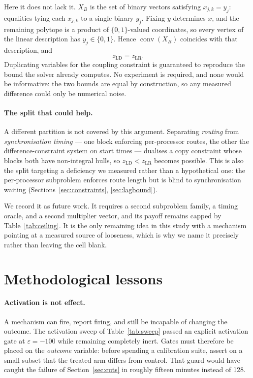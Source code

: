 \documentclass[11pt,a4paper]{article}
\begin{document}
Here it does not lack it. $X_B$ is the set of binary vectors satisfying
$x_{j,k}=y_j$: equalities tying each $x_{j,k}$ to a single binary $y_j$. Fixing
$y$ determines $x$, and the remaining polytope is a product of $\{0,1\}$-valued
coordinates, so every vertex of the linear description has $y_j\in\{0,1\}$. Hence
$\operatorname{conv}(X_B)$ coincides with that description, and
\[
z_{\mathrm{LD}}=z_{\mathrm{LR}} .
\]
Duplicating variables for the coupling constraint is guaranteed to reproduce the
bound the solver already computes. No experiment is required, and none would be
informative: the two bounds are equal by construction, so any measured difference
could only be numerical noise.

\paragraph{The split that could help.}
A different partition is not covered by this argument. Separating \emph{routing}
from \emph{synchronisation timing} --- one block enforcing per-processor routes, the
other the difference-constraint system on start times --- dualises a copy constraint
whose blocks both have non-integral hulls, so $z_{\mathrm{LD}}<z_{\mathrm{LR}}$
becomes possible. This is also the split targeting a deficiency we measured rather
than a hypothetical one: the per-processor subproblem enforces route length but is
blind to synchronisation waiting (Sections~\ref{sec:constraints},
\ref{sec:lagbound}).

We record it as future work. It requires a second subproblem family, a timing
oracle, and a second multiplier vector, and its payoff remains capped by
Table~\ref{tab:ceiling}. It is the only remaining idea in this study with a
mechanism pointing at a measured source of looseness, which is why we name it
precisely rather than leaving the cell blank.

\section{Methodological lessons}\label{sec:lessons}

\paragraph{Activation is not effect.}
A mechanism can fire, report firing, and still be incapable of changing the
outcome. The activation sweep of Table~\ref{tab:sweep} passed an explicit
activation gate at $\varepsilon=-100$ while remaining completely inert. Gates must
therefore be placed on the \emph{outcome} variable: before spending a calibration
suite, assert on a small subset that the treated arm differs from control. That
guard would have caught the failure of Section~\ref{sec:cuts} in roughly fifteen
minutes instead of 128.
\end{document}
